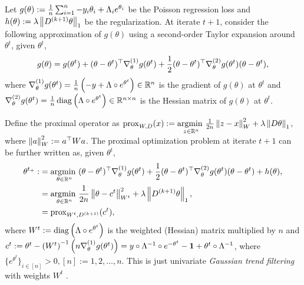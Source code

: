 Let $g(\theta):= \frac{1}{n} \sum_{i=1}^n -y_i\theta_i + \Lambda_i e^{\theta_i}$ be the Poisson regression loss and $h(\theta) := \lambda \left\lVert D^{(k+1)} \theta \right\rVert_1$ be the regularization. At iterate $t+1$, consider the following approximation of $g(\theta)$ using a second-order Taylor expansion around $\theta^t$, given $\theta^t$, 
$$ g(\theta) = g(\theta^t) + (\theta - \theta^t)^{\top} \nabla^{(1)}_{\theta} g(\theta^t) + \frac{1}{2} (\theta - \theta^t)^{\top} \nabla^{(2)}_{\theta} g(\theta^t) (\theta - \theta^t), $$
where $\nabla^{(1)}_{\theta} g(\theta^t) = \frac{1}{n} \left(-y + \Lambda\circ e^{\theta^t}\right) \in \mathbb{R}^n$ is the gradient of $g(\theta)$ at $\theta^t$ and $\nabla^{(2)}_{\theta} g(\theta^t) = \frac{1}{n}\operatorname*{diag} \left(\Lambda \circ e^{\theta^t}\right) \in \mathbb{R}^{n\times n}$ is the Hessian matrix of $g(\theta)$ at $\theta^t$. %

Define the proximal operator as $\mathrm{prox}_{W,D} (x) := \underset{z\in\mathbb{R}^n}{\operatorname*{argmin}\ } \frac{1}{2n} \left\lVert z-x \right\rVert_W^2 + \lambda \left\lVert D\theta \right\rVert_1$, where $\left\lVert a \right\rVert_{W}^2 := a^{\top} {W} a$. The proximal optimization problem at iterate $t+1$ can be further written as, given $\theta^t$,
\begin{equation} \label{eq:prox-gauss}
    \begin{split}
        \theta^{t_+} :&= \underset{\theta\in\mathbb{R}^n}{\operatorname*{argmin}\ } (\theta - \theta^t)^{\top} \nabla^{(1)}_{\theta} g(\theta^t) + \frac{1}{2} (\theta - \theta^t)^{\top} \nabla^{(2)}_{\theta} g(\theta^t) (\theta - \theta^t) + h(\theta), \\
        &= \underset{\theta\in\mathbb{R}^n}{\operatorname*{argmin}\ } \frac{1}{2n} \left\lVert \theta - c^{t} \right\rVert_{W^t}^2 + \lambda \left\lVert D^{(k+1)}\theta \right\rVert_1, \\
        &= \mathrm{prox}_{W^t,D^{(k+1)}} (c^{t}),
    \end{split}
\end{equation}
where $W^t := \operatorname*{diag} \left(\Lambda\circ e^{\theta^t}\right)$ is the weighted (Hessian) matrix multiplied by $n$ and ${c^t} := \theta^t - \left(W^{t}\right)^{-1} \left(n\nabla^{(1)}_{\theta} g(\theta^t)\right) = y\circ \Lambda^{-1}\circ e^{-\theta^t} - \boldsymbol{1} + \theta^t\circ \Lambda^{-1}$, where $\{e^{\theta^t}\}_{i\in[n]} > 0, [n]:=1,2,\dots,n$.
This is just univariate \textit{Gaussian trend filtering} with weights $W^t$ \citep{tibshirani2014adaptive}. 

